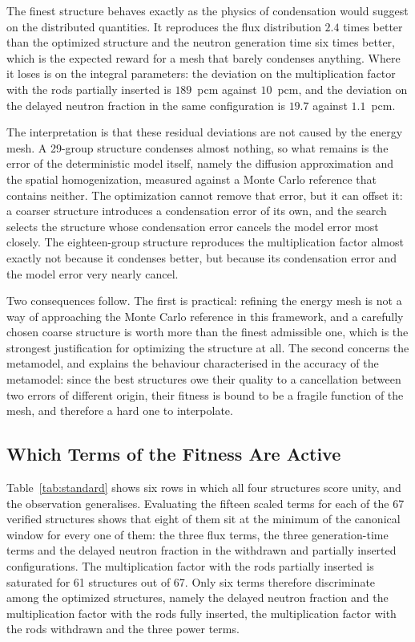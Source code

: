 \documentclass{style/nseJournal}
\begin{document}
The finest structure behaves exactly as the physics of condensation would
suggest on the distributed quantities. It reproduces the flux distribution $2.4$
times better than the optimized structure and the neutron generation time six
times better, which is the expected reward for a mesh that barely condenses
anything. Where it loses is on the integral parameters: the deviation on the
multiplication factor with the rods partially inserted is $189$~pcm against
$10$~pcm, and the deviation on the delayed neutron fraction in the same
configuration is $19.7$ against $1.1$~pcm.

The interpretation is that these residual deviations are not caused by the
energy mesh. A 29-group structure condenses almost nothing, so what remains is
the error of the deterministic model itself, namely the diffusion approximation
and the spatial homogenization, measured against a Monte Carlo reference that
contains neither. The optimization cannot remove that error, but it can offset
it: a coarser structure introduces a condensation error of its own, and the
search selects the structure whose condensation error cancels the model error
most closely. The eighteen-group structure reproduces the multiplication factor
almost exactly not because it condenses better, but because its condensation
error and the model error very nearly cancel.

Two consequences follow. The first is practical: refining the energy mesh is not
a way of approaching the Monte Carlo reference in this framework, and a
carefully chosen coarse structure is worth more than the finest admissible one,
which is the strongest justification for optimizing the structure at all. The
second concerns the metamodel, and explains the behaviour characterised in
the accuracy of the metamodel: since the best structures owe their quality to a
cancellation between two errors of different origin, their fitness is bound to
be a fragile function of the mesh, and therefore a hard one to interpolate.

\subsection{Which Terms of the Fitness Are Active}

Table~\ref{tab:standard} shows six rows in which all four structures score
unity, and the observation generalises. Evaluating the fifteen scaled terms for
each of the 67 verified structures shows that eight of them sit at the minimum
of the canonical window for every one of them: the three flux terms, the three
generation-time terms and the delayed neutron fraction in the withdrawn and
partially inserted configurations. The multiplication factor with the rods
partially inserted is saturated for 61 structures out of 67. Only six terms
therefore discriminate among the optimized structures, namely the delayed
neutron fraction and the multiplication factor with the rods fully inserted, the
multiplication factor with the rods withdrawn and the three power terms.
\end{document}
